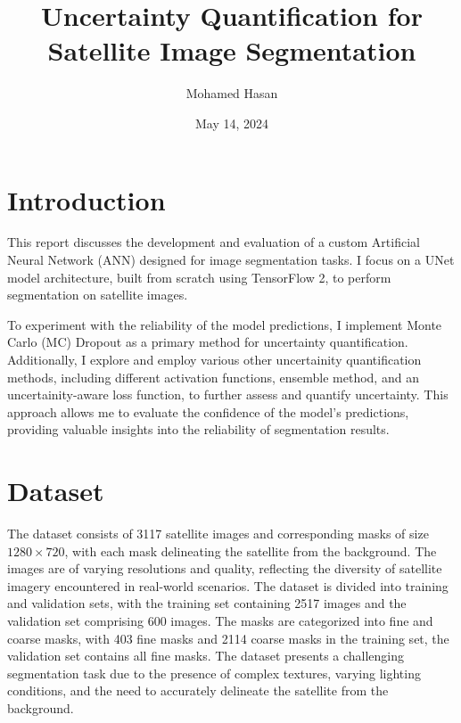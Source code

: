 \documentclass{article}
\title{Uncertainty Quantification for Satellite Image Segmentation}
\author{Mohamed Hasan}
\date{May 14, 2024}
\begin{document}
\maketitle

\section{Introduction}


This report discusses the development and evaluation of a custom Artificial Neural Network (ANN) designed for image 
segmentation tasks. I focus on a UNet model architecture, built from scratch using TensorFlow 2, to perform segmentation 
on satellite images. 

To experiment with the reliability of the model predictions, I implement Monte Carlo (MC) Dropout as a 
primary method for uncertainty quantification. Additionally, I explore and employ various other uncertainity quantification 
methods, including different activation functions, ensemble method, and an uncertainity-aware loss function, to further 
assess and quantify uncertainty. This approach allows me to evaluate the confidence of the model’s predictions, providing 
valuable insights into the reliability of segmentation results.


\section{Dataset}
The dataset consists of 3117 satellite images and corresponding masks of size $1280 \times 720$, with each 
mask delineating the satellite from the background. The images are of varying resolutions and quality, 
reflecting the diversity of satellite imagery encountered in real-world scenarios. The dataset is divided 
into training and validation sets, with the training set containing 2517 images and the validation set
comprising 600 images. The masks are categorized into fine and coarse masks, with 403 fine masks
and 2114 coarse masks in the training set, the validation set contains all fine masks. The dataset presents a 
challenging segmentation task due to the presence of complex textures, varying lighting conditions, and the 
need to accurately delineate the satellite from the background.
\end{document}
